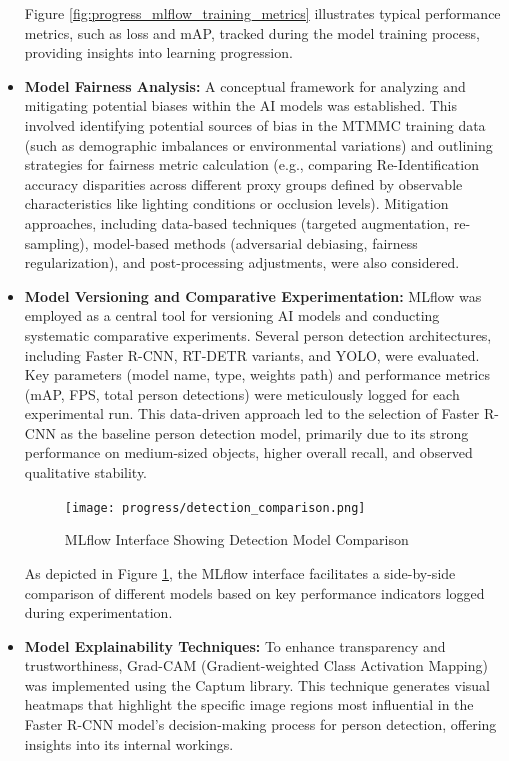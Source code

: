 \begin{itemize}
    Figure \ref{fig:progress_mlflow_training_metrics} illustrates typical performance metrics, such as loss and mAP, tracked during the model training process, providing insights into learning progression.


    \item \textbf{Model Fairness Analysis:} A conceptual framework for analyzing and mitigating potential biases within the AI models was established. This involved identifying potential sources of bias in the MTMMC training data (such as demographic imbalances or environmental variations) and outlining strategies for fairness metric calculation (e.g., comparing Re-Identification accuracy disparities across different proxy groups defined by observable characteristics like lighting conditions or occlusion levels). Mitigation approaches, including data-based techniques (targeted augmentation, re-sampling), model-based methods (adversarial debiasing, fairness regularization), and post-processing adjustments, were also considered.

    \item \textbf{Model Versioning and Comparative Experimentation:} MLflow was employed as a central tool for versioning AI models and conducting systematic comparative experiments. Several person detection architectures, including Faster R-CNN, RT-DETR variants, and YOLO, were evaluated. Key parameters (model name, type, weights path) and performance metrics (mAP, FPS, total person detections) were meticulously logged for each experimental run. This data-driven approach led to the selection of Faster R-CNN as the baseline person detection model, primarily due to its strong performance on medium-sized objects, higher overall recall, and observed qualitative stability.

    \begin{figure}[!htb]
        \centering
        \texttt{[image: progress/detection\_comparison.png]}
        \caption{MLflow Interface Showing Detection Model Comparison}
        \label{fig:progress_mlflow_model_comparison}
    \end{figure}
    
    As depicted in Figure \ref{fig:progress_mlflow_model_comparison}, the MLflow interface facilitates a side-by-side comparison of different models based on key performance indicators logged during experimentation.

    \item \textbf{Model Explainability Techniques:} To enhance transparency and trustworthiness, Grad-CAM (Gradient-weighted Class Activation Mapping) was implemented using the Captum library. This technique generates visual heatmaps that highlight the specific image regions most influential in the Faster R-CNN model's decision-making process for person detection, offering insights into its internal workings.
    

\end{itemize}
